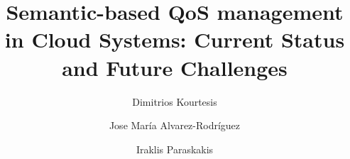 \documentclass[preprint,12pt]{elsarticle}
\begin{document}
\begin{frontmatter}





\title{Semantic-based QoS management in Cloud Systems: Current Status and Future Challenges}


 \author[seerc]{Dimitrios Kourtesis}
 
 \author[seerc]{Jose Mar\'{i}a Alvarez-Rodr\'{i}guez}
 
 \author[seerc]{Iraklis Paraskakis}
 
 \address[seerc]{South East European Research Centre (SEERC), 24 Proxenou Koromila Street, Thessaloniki, 54622, Greece}

    

% 
% 







\end{frontmatter}
\end{document}
